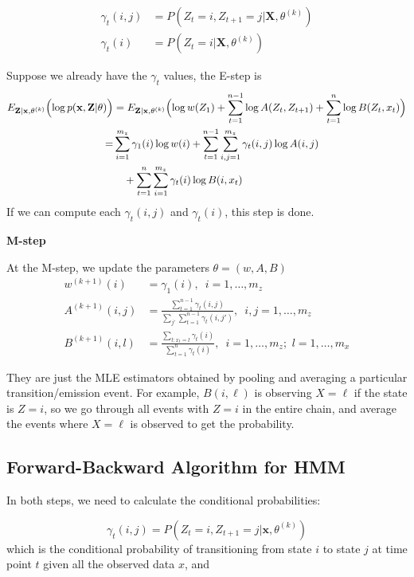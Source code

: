 \documentclass[
]{book}
\begin{document}
\begin{align*}
\gamma_t(i,j) &= P(Z_t=i, Z_{t+1}=j | \mathbf{X}, \theta^{(k)})\\
\gamma_t(i) &= P(Z_t=i | \mathbf{X}, \theta^{(k)})
\end{align*}

Suppose we already have the \(\gamma_t\) values, the E-step is
\begin{align*}
 E_{\mathbf{Z}|\mathbf{x}, \theta^{(k)}}\Bigl( \log p(\mathbf{x}, \mathbf{Z}|\theta) \Bigr) &= E_{\mathbf{Z}|\mathbf{x}, \theta^{(k)}} \Bigl( \log w(Z_1) + \sum_{t=1}^{n-1} \log A(Z_t, Z_{t+1}) + \sum_{t=1}^{n} \log B(Z_t, x_t) \Bigr)\\
=& \sum_{i=1}^{m_z} \gamma_1(i) \log w(i) + \sum_{t=1}^{n-1} \sum_{i,j=1}^{m_z} \gamma_t(i,j) \log A(i,j)\\
&\quad + \sum_{t=1}^{n} \sum_{i=1}^{m_z} \gamma_t(i) \log B(i, x_t)\\
\end{align*}
If we can compute each \(\gamma_t(i,j)\) and \(\gamma_t(i)\), this step is done.

\textbf{M-step}

At the M-step, we update the parameters \(\theta = (w, A, B)\)
\begin{align*}
w^{(k+1)}(i) &= \gamma_1(i), \,\,\, i=1, \ldots, m_z\\
A^{(k+1)}(i,j) &= \frac{\sum_{t=1}^{n-1} \gamma_t(i,j)}{\sum_{j'} \sum_{t=1}^{n-1} \gamma_t(i,j')}, \,\,\, i,j=1, \ldots, m_z\\
B^{(k+1)}(i,l) &= \frac{\sum_{t:x_t=l} \gamma_t(i)}{\sum_{t=1}^{n}  \gamma_t(i)}, \,\,\, i=1, \ldots, m_z;\, \, l=1, \ldots, m_x
\end{align*}

They are just the MLE estimators obtained by pooling and
averaging a particular transition/emission event. For example, \(B(i, \ell)\) is observing \(X = \ell\) if the state is \(Z = i\), so we go through all events with \(Z = i\) in the entire chain, and average
the events where \(X = \ell\) is observed to get the probability.

\subsection{Forward-Backward Algorithm for HMM}\label{forward-backward-algorithm-for-hmm}

In both steps, we need to calculate the conditional probabilities:

\[\gamma_t(i,j) = P(Z_t = i, Z_{t+1} = j|\mathbf{x}, \theta^{(k)})\]
which is the conditional probability of transitioning from state \(i\) to
state \(j\) at time point \(t\) given all the observed data \(x\), and
\end{document}
